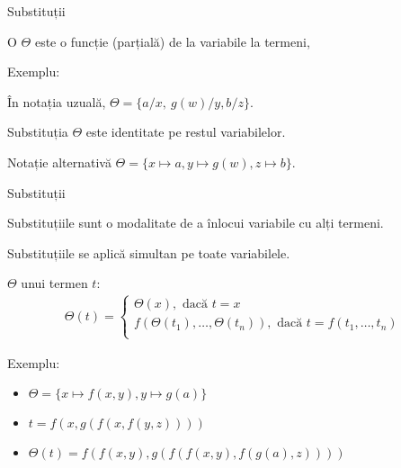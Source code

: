 \documentclass[xcolor=pdftex,romanian,colorlinks]{beamer}
\begin{document}
\begin{frame}{Substituții}

O  $\Theta$ este o funcție (parțială) de la variabile la termeni,
\vspace{-.2cm}
	\begin{center}
	\end{center}

\medskip
{\color{True} Exemplu:}

În notația uzuală, $\Theta = \{ a/x,\ g(w)/y, b/z\}$. 

Substituția $\Theta$ este identitate pe restul variabilelor.

Notație alternativă $\Theta = \{x \mapsto a, y \mapsto g(w), z \mapsto b\}$.


\end{frame}

\begin{frame}{Substituții}

Substituțiile sunt o modalitate de a înlocui variabile cu alți termeni.

Substituțiile se aplică simultan pe toate variabilele.


\medskip
{} $\Theta$ unui termen $t$:
\begin{align*}
\Theta(t) = 
\left\{
	\begin{array}{ll}
		\Theta(x), \mbox{ dacă } t = x \\
		f(\Theta(t_1),\ldots,\Theta(t_n)), \mbox{ dacă } t = f(t_1,\ldots,t_n) \\
	\end{array}
\right. 
\end{align*}

 {\color{True} Exemplu:}
\begin{itemize}
	\item $\Theta = \{x \mapsto f(x,y), y \mapsto g(a) \}$
	\item $t = f(x,g(f(x,f(y,z))))$
	\item $\Theta(t) = f(f(x,y),g(f(f(x,y),f(g(a),z))))$
\end{itemize}
\end{frame}
\end{document}
